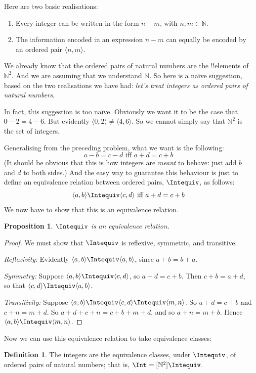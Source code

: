 \documentclass[10pt,a4paper]{article}
\theoremstyle{plain}
\newtheorem{prop}[thm]{Proposition}
\theoremstyle{definition}
\newtheorem{defn}[thm]{Definition}
\theoremstyle{remark}
\providecommand{\tuple}[1]{\langle #1 \rangle}
\providecommand{\Nat}{\ensuremath{\mathbb{N}}}
\providecommand{\equivclass}[1]{[#1]}
\begin{document}
Here are two basic realisations:
	\begin{enumerate}
		\item Every integer can be written in the form $n - m$, with $n, m \in\Nat$.
		\item The information encoded in an expression $n - m$ can equally be encoded by an ordered pair $\tuple{n, m}$.
	\end{enumerate}
We already know that the ordered pairs of natural numbers are the !!{element}s of $\Nat^2$. And we are assuming that we understand $\Nat$. So here is a na\"{i}ve suggestion, based on the two realisations we have had: \emph{let's treat integers as ordered pairs of natural numbers}.

In fact, this suggestion is too na\"{i}ve. Obviously we want it to be the case that $0- 2 = 4 - 6$. But evidently $\tuple{0, 2 }\neq \tuple{4, 6}$. So we cannot simply say that $\Nat^2$ is the set of integers. 

Generalising from the preceding problem, what we want is the following:
	$$a - b = c - d \text{ iff }a + d = c + b$$
(It should be obvious that this is how integers are \emph{meant} to behave: just add $b$ and $d$ to both sides.) And the easy way to guarantee this behaviour is just to define an equivalence relation between ordered pairs, $\Intequiv$, as follows:
$$\tuple{ a, b } \Intequiv \tuple{c, d}\text{ iff }a + d = c + b$$  
We now have to show that this is an equivalence relation.
\begin{prop} $\Intequiv$ is an equivalence relation.
\end{prop}
	\begin{proof}
	We must show that $\Intequiv$ is reflexive, symmetric, and transitive. 
	
	\emph{Reflexivity:} Evidently $\tuple{a, b} \Intequiv \tuple{a, b}$, since $a + b = b + a$.
	
	\emph{Symmetry:} Suppose $\tuple{a, b} \Intequiv \tuple{c, d}$, so $a + d = c + b$. Then $c + b = a + d$, so that $\tuple{c, d} \Intequiv \tuple{a, b}$.
	
	\emph{Transitivity:} Suppose $\tuple{a, b} \Intequiv \tuple{c, d}\Intequiv \tuple{m, n}$. So $a + d = c + b$ and $c + n = m + d$. So $a + d + c + n = c + b + m + d$, and so $a + n = m + b$. Hence $\tuple{a, b } \Intequiv \tuple{m, n}$.		
\end{proof}

Now we can use this equivalence relation to take equivalence classes:

\begin{defn}
		The integers are the equivalence classes, under $\Intequiv$, of  ordered pairs of natural numbers; that is, $\Int = \equivclass{\Nat^2}{\Intequiv}$.
\end{defn}
\end{document}
